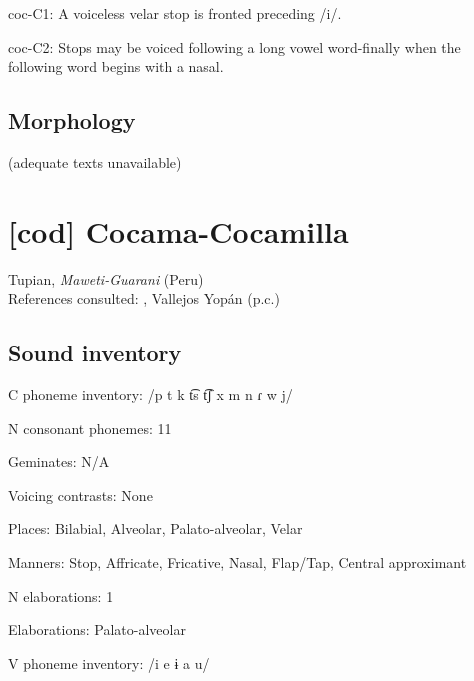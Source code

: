 {\begin{appendixdesc}
\item[coc-C1:] A voiceless velar stop is fronted preceding /i/. \citep[15]{Crawford1966}

\item[coc-C2:] Stops may be voiced following a long vowel word-finally when the following word begins with a nasal. \citep[99--100]{Bendixen1980}
\end{appendixdesc}
\subsection*{Morphology}

(adequate texts unavailable)

\section*{[cod] Cocama-Cocamilla}  %
Tupian, \textit{Maweti-Guarani} (Peru)\medskip\\
References consulted:  \citet{VallejosYopán2010}, Vallejos Yopán (p.c.)

\subsection*{Sound inventory}
\begin{appendixdesc}

\item[C phoneme inventory:] /p t k t͡s t͡ʃ x m n ɾ w j/

\item[N consonant phonemes:] 11

\item[Geminates:] N/A

\item[Voicing contrasts:] None

\item[Places:] Bilabial, Alveolar, Palato-alveolar, Velar

\item[Manners:] Stop, Affricate, Fricative, Nasal, Flap/Tap, Central approximant

\item[N elaborations:] 1

\item[Elaborations:] Palato-alveolar

\item[V phoneme inventory:] /i e ɨ a u/


\end{appendixdesc}}
